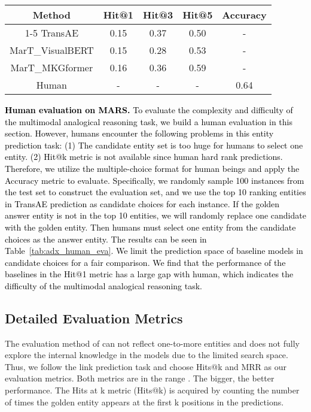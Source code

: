 \documentclass{article} \usepackage{iclr2023_conference,times}
\newcommand{\ours}{MarT}
\newcommand{\data}{MARS}
\begin{document}
\begin{table*}[!htp]\color{black}
\small
\centering
\begin{tabular}{ccccc}
\toprule
  Method & Hit@1 & Hit@3 & Hit@5 & Accuracy \\
\cmidrule{1-5}
    TransAE & 0.15 & 0.37 & 0.50 & - \\
    {\ours}\_VisualBERT & 0.15 & 0.28 & 0.53 & - \\
    {\ours}\_MKGformer & 0.16 & 0.36 & 0.59 & - \\
    Human & - & - & - & 0.64 \\
\bottomrule
\end{tabular}
\caption{\textcolor{black}{Human evaluation on {\data}.}}
\label{tab:adx_human_eva}
\end{table*}
\textcolor{black}{
\textbf{Human evaluation on \data.}
To evaluate the complexity and difficulty of the multimodal analogical reasoning task, we build a human evaluation in this section. However, humans encounter the following problems in this entity prediction task: (1) The candidate entity set is too huge for humans to select one entity. (2) Hit@k metric is not available since human hard rank predictions. Therefore, we utilize the multiple-choice format for human beings and apply the Accuracy metric to evaluate. Specifically, we randomly sample 100 instances from the test set to construct the evaluation set, and we use the top 10 ranking entities in TransAE prediction as candidate choices for each instance. If the golden answer entity is not in the top 10 entities, we will randomly replace one candidate with the golden entity. Then humans must select one entity from the candidate choices as the answer entity. The results can be seen in Table~\ref{tab:adx_human_eva}. We limit the prediction space of baseline models in candidate choices for a fair comparison. We find that the performance of the baselines in the Hit@1 metric  has a large gap with human, which indicates the difficulty of the multimodal analogical reasoning task. 
}


\subsection{Detailed Evaluation Metrics}
\label{adx:metric}

The evaluation method of \citep{E-KAR} can not reflect one-to-more entities and does not fully explore the internal knowledge in the models due to the limited search space. 
Thus, we follow the link prediction task and choose Hits@k and MRR as our evaluation metrics. Both metrics are in the range . The bigger, the better performance.
The Hits at k metric (Hits@k) is acquired by counting the number of times the golden entity appears at the first k positions in the predictions. 
\end{document}
